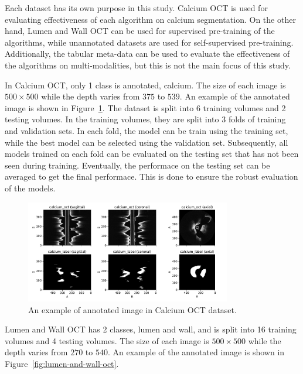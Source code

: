 \documentclass[a4paper,11pt,oneside]{report}
\begin{document}
Each dataset has its own purpose in this study. Calcium OCT is used for evaluating effectiveness of each algorithm on calcium segmentation. On the other hand, Lumen and Wall OCT can be used for supervised pre-training of the algorithms, while unannotated datasets are used for self-supervised pre-training. Additionally, the tabular meta-data can be used to evaluate the effectiveness of the algorithms on multi-modalities, but this is not the main focus of this study.

In Calcium OCT, only 1 class is annotated, calcium. The size of each image is $500\times 500$ while the depth varies from $375$ to $539$. An example of the annotated image is shown in Figure~\ref{fig:calcium-oct}. The dataset is split into 6 training volumes and 2 testing volumes. In the training volumes, they are split into 3 folds of training and validation sets. In each fold, the model can be train using the training set, while the best model can be selected using the validation set. Subsequently, all models trained on each fold can be evaluated on the testing set that has not been seen during training. Eventually, the performace on the testing set can be averaged to get the final performace. This is done to ensure the robust evaluation of the models.

\begin{figure}[ht]
    \centering
    \includegraphics[width=0.8\textwidth]{figures/fig_datasets_calcium_oct_sample.pdf}
    \caption{An example of annotated image in Calcium OCT dataset.}
    \label{fig:calcium-oct}
\end{figure}

Lumen and Wall OCT has 2 classes, lumen and wall, and is split into 16 training volumes and 4 testing volumes. The size of each image is $500\times 500$ while the depth varies from $270$ to $540$. An example of the annotated image is shown in Figure~\ref{fig:lumen-and-wall-oct}.
\end{document}
